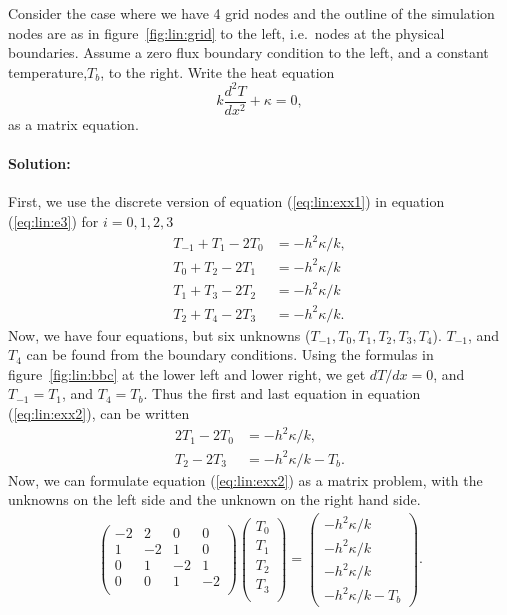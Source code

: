 \documentclass[graybox,sectrefs,envcountresetchap,open=right,final]{svmonodo}
\newenvironment{graybox2admon}[1][]{
\begin{graybox2mdframed}[frametitle=#1]
}
{
\end{graybox2mdframed}
}
\begin{document}
\begin{graybox2admon}[Example: Steady state heat equation as a linear problem]
Consider the case where we have 4 grid nodes and the outline of the simulation nodes are as in figure~\ref{fig:lin:grid} to the left, i.e.~nodes at the physical  boundaries. Assume a zero flux boundary condition to the left, and a constant temperature,$T_b$, to the right. Write the heat equation
\begin{equation}
k\frac{d^2T}{dx^2}+\kappa=0,
\label{eq:lin:exx1}
\end{equation}
as a matrix equation.

\paragraph{Solution:}
First, we use the discrete version of equation (\ref{eq:lin:exx1}) in equation (\ref{eq:lin:e3}) for $i=0, 1, 2, 3$
\begin{align}
T_{-1}+T_1-2T_0 &=-h^2\kappa/k,\nonumber \\ 
T_{0}+T_2-2T_1 &=-h^2\kappa/k\nonumber \\ 
T_{1}+T_3-2T_2 &=-h^2\kappa/k\nonumber \\ 
T_{2}+T_4-2T_3 &=-h^2\kappa/k.
\label{eq:lin:exx2}
\end{align}
Now, we have four equations, but six unknowns ($T_{-1}, T_0, T_1, T_2, T_3, T_4$). $T_{-1}$, and $T_4$ can be found from the boundary conditions. Using the formulas in figure~\ref{fig:lin:bbc} at the lower left and lower right, we get $dT/dx=0$, and $T_{-1}=T_1$, and $T_4=T_b$. Thus the first and last equation in equation (\ref{eq:lin:exx2}), can be written
\begin{align}
2T_1-2T_0 &=-h^2\kappa/k,\nonumber \\ 
T_{2}-2T_3 &=-h^2\kappa/k-T_b.
\label{eq:lin:2b}
\end{align}
Now, we can formulate equation (\ref{eq:lin:exx2}) as a matrix problem, with the unknowns on the left side and the unknown on the right hand side.
\begin{align}
\left(
\begin{array}{cccc}
-2&2&0&0\\ 
1&-2&1&0\\ 
0&1&-2&1\\ 
0&0&1&-2\\ 
\end{array}
\right)
\left(
\begin{array}{c}
T_0\\ 
T_1\\ 
T_2\\ 
T_3\\ 
\end{array}
\right)
=
\left(
\begin{array}{c}
-h^2\kappa/k\\ 
-h^2\kappa/k\\ 
-h^2\kappa/k\\ 
-h^2\kappa/k-T_b
\end{array}
\right).
\end{align}
\label{eq:lin:exx4}
\end{graybox2admon}
\end{document}
